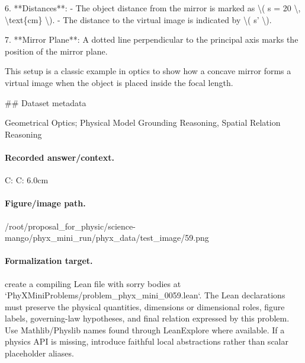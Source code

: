 6. **Distances**: 
   - The object distance from the mirror is marked as \textbackslash{}( s = 20 \textbackslash{}, \textbackslash{}text\{cm\} \textbackslash{}).
   - The distance to the virtual image is indicated by \textbackslash{}( s' \textbackslash{}).

7. **Mirror Plane**: A dotted line perpendicular to the principal axis marks the position of the mirror plane.

This setup is a classic example in optics to show how a concave mirror forms a virtual image when the object is placed inside the focal length.

\#\# Dataset metadata

Geometrical Optics; Physical Model Grounding Reasoning, Spatial Relation Reasoning

\paragraph{Recorded answer/context.}
C: C: 6.0cm

\paragraph{Figure/image path.}
/root/proposal\_for\_physic/science-mango/phyx\_mini\_run/phyx\_data/test\_image/59.png

\paragraph{Formalization target.}
create a compiling Lean file with sorry bodies at `PhyXMiniProblems/problem\_phyx\_mini\_0059.lean`. The Lean declarations must preserve the physical quantities, dimensions or dimensional roles, figure labels, governing-law hypotheses, and final relation expressed by this problem.
Use Mathlib/Physlib names found through LeanExplore where available. If a physics API is missing, introduce faithful local abstractions rather than scalar placeholder aliases.

